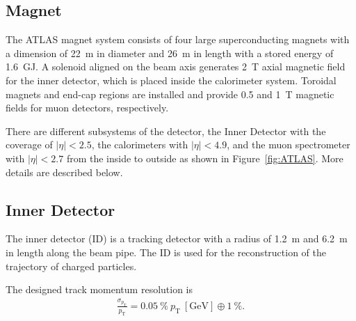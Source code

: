\subsection{Magnet}
The ATLAS magnet system consists of four large superconducting magnets with a dimension of 22~m in diameter and 26~m in length with a stored energy of 1.6~GJ. A solenoid aligned on the beam axis generates 2~T axial magnetic field for the inner detector, which is placed inside the calorimeter system. 
Toroidal magnets and end-cap regions are installed and provide 0.5 and 1~T magnetic fields for muon detectors, respectively.

There are different subsystems of the detector, the Inner Detector with the coverage of $| \eta | < 2.5$, the calorimeters with $| \eta | < 4.9$, and  the muon spectrometer with $| \eta | < 2.7$ from the inside to outside as shown in Figure~\ref{fig:ATLAS}. 
More details are described below.

\subsection{Inner Detector}
The inner detector (ID) is a tracking detector with a radius of 1.2~m and 6.2~m in length along the beam pipe. 
The ID is used for the reconstruction of the trajectory of charged particles. 

The designed track momentum resolution is
\begin{eqnarray*}
    \frac{\sigma_{p_{\mathrm{T}}}}{p_{\mathrm{T}}} = 0.05~\% ~p_{\mathrm{T}}~[\mathrm{GeV}] \oplus 1~\%.
\end{eqnarray*}

